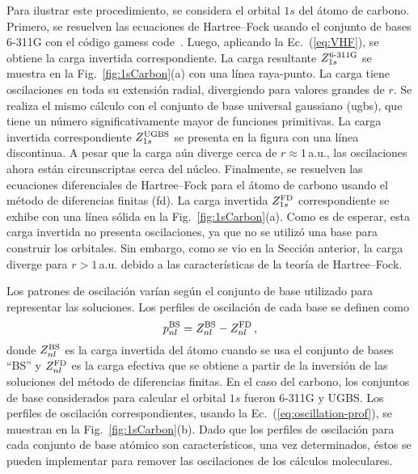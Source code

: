 Para ilustrar este procedimiento, se considera el orbital $1s$ del átomo 
de carbono. Primero, se resuelven las ecuaciones de Hartree--Fock usando 
el conjunto de bases \mbox{6-311G} con el código {\sc gamess} 
code~\cite{Schmidt:93,Gordon:05}. Luego, aplicando la 
Ec.~(\ref{eq:VHF}), se obtiene la carga invertida correspondiente. La 
carga resultante $Z_{1s}^{\mbox{\scriptsize 6-311G}}$ se muestra en la 
Fig.~\ref{fig:1sCarbon}(a) con una línea raya-punto. La carga tiene  
oscilaciones en toda su extensión radial, divergiendo para valores 
grandes de $r$. Se realiza el mismo cálculo con el conjunto de base 
universal gaussiano (\acs{ugbs}), que tiene un número significativamente 
mayor de funciones primitivas. La carga invertida correspondiente 
$Z_{1s}^{\mbox{\scriptsize UGBS}}$ se presenta en la figura con una línea 
discontinua. A pesar que la carga aún diverge cerca de 
$r\approx1\,$a.u., las oscilaciones ahora están circunscriptas cerca del 
núcleo. Finalmente, se resuelven las ecuaciones diferenciales de 
Hartree--Fock para el átomo de carbono usando el método de diferencias 
finitas (\acs{fd}). La carga invertida $Z_{1s}^{\mbox{\scriptsize FD}}$ 
correspondiente se exhibe con una línea sólida en la 
Fig.~\ref{fig:1sCarbon}(a). Como es de esperar, esta carga invertida no 
presenta oscilaciones, ya que no se utilizó una base para construir los 
orbitales. Sin embargo, como se vio en la Sección anterior, la carga 
diverge para $r>1\,$a.u. debido a las características 
de la teoría de Hartree--Fock. 

Los patrones de oscilación varían según el conjunto de base utilizado
para representar las soluciones. Los perfiles de oscilación de cada base 
se definen como
\begin{equation}
 p_{nl}^{\mbox{\scriptsize BS}} = Z_{nl}^{\mbox{\scriptsize BS}}-
 Z_{nl}^{\mbox{\scriptsize FD}} \,,
 \label{eq:oscillation-prof}
\end{equation}
donde $Z_{nl}^{\mbox{\scriptsize BS}}$ es la carga invertida del átomo
cuando se usa el conjunto de bases ``BS'' y 
$Z_{nl}^{\mbox{\scriptsize FD}}$ es la carga efectiva que se obtiene a 
partir de la inversión de las soluciones del método de diferencias 
finitas. En el caso del carbono, los conjuntos de base considerados para 
calcular el orbital $1s$ fueron \mbox{6-311G} y UGBS. Los perfiles de 
oscilación correspondientes, usando la Ec.~(\ref{eq:oscillation-prof}), 
se muestran en la Fig.~\ref{fig:1sCarbon}(b). Dado que los perfiles de 
oscilación para cada conjunto de base atómico son característicos, una 
vez determinados, éstos se pueden implementar para remover las 
oscilaciones de los cálculos moleculares. 

